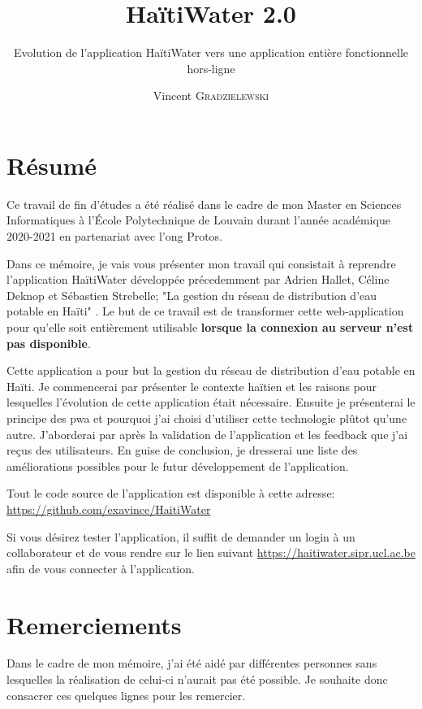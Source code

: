 \documentclass{EPL-master-thesis-covers-FR}
\title{HaïtiWater 2.0}
\subtitle{Evolution de l'application HaïtiWater vers une application entière  fonctionnelle hors-ligne}
\author{Vincent \textsc{Gradzielewski}}%
\begin{document}
	\maketitle
	\tableofcontents

	\setlength{\parskip}{1.5em plus1em minus1em}


	\chapter*{Résumé}
	
	
		Ce travail de fin d'études a été réalisé dans le cadre de mon Master en Sciences Informatiques à l'École Polytechnique de Louvain durant l'année académique 2020-2021 en partenariat avec l'\gls{ong} Protos.
		
		Dans ce mémoire, je vais vous présenter mon travail qui consistait à reprendre l'application HaïtiWater développée précedemment par Adrien Hallet, Céline Deknop et Sébastien Strebelle; "La gestion du réseau de distribution d'eau potable en Haïti" \cite{ref:haitiwater}. Le but de ce travail est de transformer cette web-application pour qu'elle soit entièrement utilisable \textbf{lorsque la connexion au serveur n'est pas disponible}.
	
		Cette application a pour but la gestion du réseau de distribution d'eau potable en Haïti. Je commencerai par présenter le contexte haïtien et les raisons pour lesquelles l'évolution de cette application était nécessaire. Ensuite je présenterai le principe des \gls{pwa} et pourquoi j'ai choisi d'utiliser cette technologie plûtot qu'une autre. J'aborderai par après la validation de l'application et les feedback que j'ai reçus des utilisateurs. En guise de conclusion, je dresserai une liste des améliorations possibles pour le futur développement de l'application.

		Tout le code source de l'application est disponible à cette adresse: \url{https://github.com/exavince/HaitiWater}

		Si vous désirez tester l'application, il suffit de demander un login à un collaborateur et de vous rendre sur le lien suivant \url{https://haitiwater.sipr.ucl.ac.be} afin de vous connecter à l'application.
		

	\chapter*{Remerciements}
		Dans le cadre de mon mémoire, j'ai été aidé par différentes personnes sans lesquelles la réalisation de celui-ci n'aurait pas été possible. Je souhaite donc consacrer ces quelques lignes pour les remercier.
		
\end{document}
